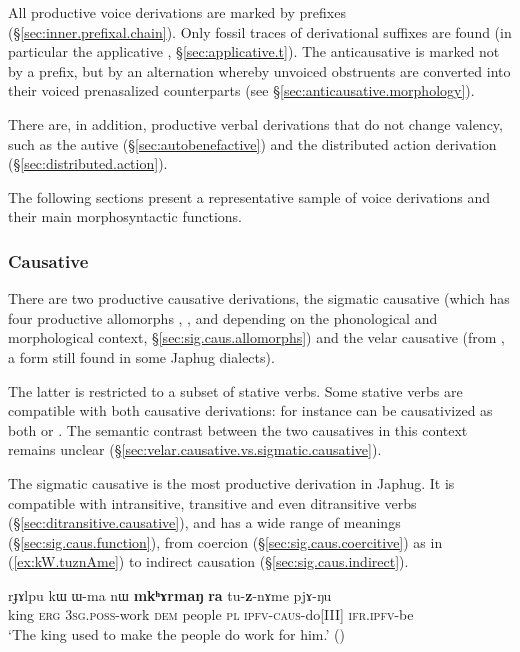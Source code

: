 All productive voice derivations are marked by prefixes (§\ref{sec:inner.prefixal.chain}). Only fossil traces of derivational suffixes are found (in particular the applicative , §\ref{sec:applicative.t}). The anticausative is marked not by a prefix, but by an alternation whereby unvoiced obstruents are converted into their voiced prenasalized counterparts (see §\ref{sec:anticausative.morphology}).

There are, in addition, productive verbal derivations that do not change valency, such as the autive  (§\ref{sec:autobenefactive}) and the distributed action derivation  (§\ref{sec:distributed.action}).

The following sections present a representative sample of voice derivations and their main morphosyntactic functions.

\subsubsection{Causative}
There are two productive causative derivations, the sigmatic causative (which has four productive allomorphs , ,  and  depending on the phonological and morphological context, §\ref{sec:sig.caus.allomorphs}) and the velar causative  (from , a form still found in some Japhug dialects).

The latter is restricted to a subset of stative verbs. Some stative verbs are compatible with both causative derivations: for instance  can be causativized as both  or . The semantic contrast between the two causatives in this context remains unclear (§\ref{sec:velar.causative.vs.sigmatic.causative}).

The sigmatic causative is the most productive derivation in Japhug. It is compatible with intransitive, transitive and even ditransitive verbs (§\ref{sec:ditransitive.causative}), and has a wide range of meanings (§\ref{sec:sig.caus.function}), from coercion (§\ref{sec:sig.caus.coercitive}) as in (\ref{ex:kW.tuznAme}) to indirect causation (§\ref{sec:sig.caus.indirect}).

\begin{exe}
\ex  \label{ex:kW.tuznAme}
\gll rɟɤlpu kɯ  ɯ-ma nɯ  \textbf{mkʰɤrmaŋ} \textbf{ra} tu-\textbf{z}-nɤme pjɤ-ŋu  \\
king \textsc{erg} \textsc{3sg}.\textsc{poss}-work \textsc{dem} people \textsc{pl}   \textsc{ipfv}-\textsc{caus}-do[III] \textsc{ifr}.\textsc{ipfv}-be \\
\glt `The king used to make the people do work for him.' 
()
\end{exe}

